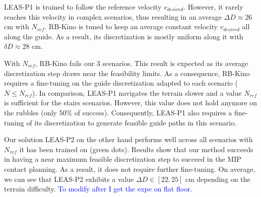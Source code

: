 LEAS-P1 is trained to follow the reference velocity $v_{desired}$.
However, it rarely reaches this velocity in complex scenarios, thus resulting in an average $\Delta D \approx 26$ cm with $N_{ref}$.
RB-Kino is tuned to keep an average constant velocity $v_{desired}$ all along the guide. As a result, its discretization is mostly uniform along it with $\delta D \approx 28$ cm.

With $N_{ref}$, RB-Kino fails our 3 scenarios. This result is expected as its average discretization step draws near the feasibility limits.
As a consequence, RB-Kino requires a fine-tuning on the guide discretization adapted to each scenario ($N \leq N_{ref}$).
In comparison, LEAS-P1 navigates the terrain slower and a value $N_{ref}$ is sufficient for the stairs scenarios. 
However, this value does not hold anymore on the rubbles (only 50\% of success). 
Consequently, LEAS-P1 also requires a fine-tuning of its discretization to generate feasible guide paths in this scenario.

Our solution LEAS-P2 on the other hand performs well across all scenarios with $N_{ref}$ it has been trained on (green dots).
Results show that our method succeeds in having a near maximum feasible discretization step to succeed in the MIP contact planning. 
As a result, it does not require further fine-tuning.
On average, we can see that LEAS-P2 exhibits a value $\Delta D \in [22, 25]$ cm depending on the terrain difficulty. \textcolor{blue}{To modify after I get the expe on flat floor.}


